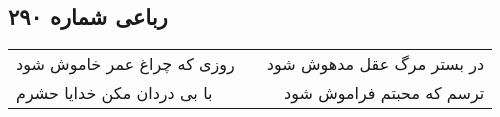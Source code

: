 \begin{center}
\section*{رباعی شماره ۲۹۰}
\label{sec:sh290}
\begin{longtable}{l p{0.5cm} r}
روزی که چراغ عمر خاموش شود
&&
در بستر مرگ عقل مدهوش شود
\\
با بی دردان مکن خدایا حشرم
&&
ترسم که محبتم فراموش شود
\\
\end{longtable}
\end{center}
